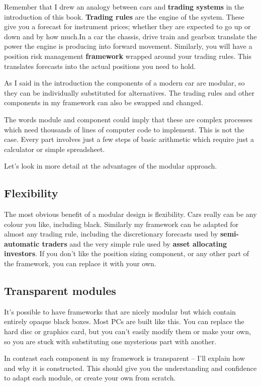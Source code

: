 Remember that I drew an analogy between cars and \textbf{trading systems} in the introduction of this book. \textbf{Trading rules} are the engine of the system. These give you a forecast for instrument prices; whether they are expected to go up or down and by how much.In a car the chassis, drive train and gearbox translate the power the engine is producing into forward movement. Similarly, you will have a position risk management \textbf{framework} wrapped around your trading rules. This translates forecasts into the actual positions you need to hold.

As I said in the introduction the components of a modern car are modular, so they can be individually substituted for alternatives. The trading rules and other components in my framework can also be swapped and changed.

The words module and component could imply that these are complex processes which need thousands of lines of computer code to implement. This is not the case. Every part involves just a few steps of basic arithmetic which require just a calculator or simple spreadsheet.

Let's look in more detail at the advantages of the modular approach.

\subsection*{Flexibility}

The most obvious benefit of a modular design is flexibility. Cars really can be any colour you like, including black. Similarly my framework can be adapted for almost any trading rule, including the discretionary forecasts used by \textbf{semi-automatic traders} and the very simple rule used by \textbf{asset allocating investors}. If you don't like the position sizing component, or any other part of the framework, you can replace it with your own.

\subsection*{Transparent modules}

It's possible to have frameworks that are nicely modular but which contain entirely opaque black boxes. Most PCs are built like this. You can replace the hard disc or graphics card, but you can't easily modify them or make your own, so you are stuck with substituting one mysterious part with another.

In contrast each component in my framework is transparent -- I'll explain how and why it is constructed. This should give you the understanding and confidence to adapt each module, or create your own from scratch.

